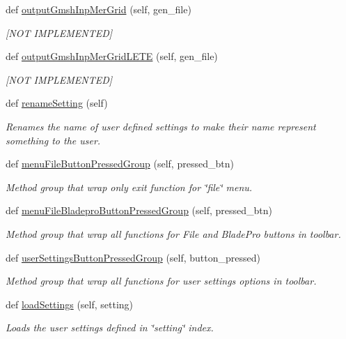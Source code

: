 \begin{DoxyCompactItemize}
def \hyperlink{a00070_a258f943645c60945cbb97494db0ebf52}{output\+Gmsh\+Inp\+Mer\+Grid} (self, gen\+\_\+file)
\begin{DoxyCompactList}\small\item\em \mbox{[}N\+OT I\+M\+P\+L\+E\+M\+E\+N\+T\+ED\mbox{]} \end{DoxyCompactList}\item 
def \hyperlink{a00070_aa07573686af3bd04e4ff42c3dddcf975}{output\+Gmsh\+Inp\+Mer\+Grid\+L\+E\+TE} (self, gen\+\_\+file)
\begin{DoxyCompactList}\small\item\em \mbox{[}N\+OT I\+M\+P\+L\+E\+M\+E\+N\+T\+ED\mbox{]} \end{DoxyCompactList}\item 
def \hyperlink{a00070_a464a8ac16bcb67d41a6d91ee8b51acf2}{rename\+Setting} (self)
\begin{DoxyCompactList}\small\item\em Renames the name of user defined settings to make their name represent something to the user. \end{DoxyCompactList}\item 
def \hyperlink{a00070_a35cf87c6230239ce47b33bda03bd7432}{menu\+File\+Button\+Pressed\+Group} (self, pressed\+\_\+btn)
\begin{DoxyCompactList}\small\item\em Method group that wrap only exit function for \char`\"{}file\char`\"{} menu. \end{DoxyCompactList}\item 
def \hyperlink{a00070_ad94f49b4827a3ea0b56070e0149ae2aa}{menu\+File\+Bladepro\+Button\+Pressed\+Group} (self, pressed\+\_\+btn)
\begin{DoxyCompactList}\small\item\em Method group that wrap all functions for File and Blade\+Pro buttons in toolbar. \end{DoxyCompactList}\item 
def \hyperlink{a00070_a1b508dd4cb9c699a1769e7727d1e6fc1}{user\+Settings\+Button\+Pressed\+Group} (self, button\+\_\+pressed)
\begin{DoxyCompactList}\small\item\em Method group that wrap all functions for user settings options in toolbar. \end{DoxyCompactList}\item 
def \hyperlink{a00070_a0c4f30850537553db0ff2e27059733a4}{load\+Settings} (self, setting)
\begin{DoxyCompactList}\small\item\em Loads the user settings defined in \char`\"{}setting\char`\"{} index. \end{DoxyCompactList}\item 

\end{DoxyCompactItemize}
